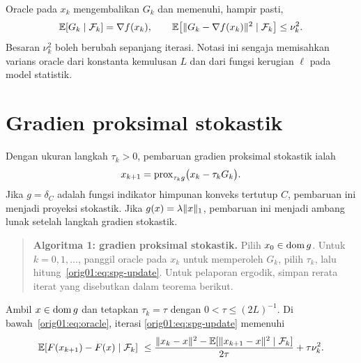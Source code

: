 Oracle pada $x_k$ mengembalikan $G_k$ dan memenuhi, hampir pasti,
\begin{equation}
  \label{orig01:eq:oracle}
  \mathbb{E}[G_k\mid\mathcal F_k]=\nabla f(x_k),
  \qquad
  \mathbb{E}\!\left[\|G_k-\nabla f(x_k)\|^2\mid\mathcal F_k\right]
  \leq \nu_k^2.
\end{equation}
Besaran $\nu_k^2$ boleh berubah sepanjang iterasi. Notasi ini sengaja
memisahkan varians oracle dari konstanta kemulusan $L$ dan dari fungsi
kerugian $\ell$ pada model statistik.

\section{Gradien proksimal stokastik}
\label{orig01:section:spg}

Dengan ukuran langkah $\tau_k>0$, pembaruan gradien proksimal stokastik ialah
\begin{equation}
  \label{orig01:eq:spg-update}
  x_{k+1}
  =\mathrm{prox}_{\tau_k g}\bigl(x_k-\tau_kG_k\bigr).
\end{equation}
Jika $g=\delta_C$ adalah fungsi indikator himpunan konveks tertutup $C$,
pembaruan ini menjadi proyeksi stokastik. Jika $g(x)=\lambda\|x\|_1$,
pembaruan ini menjadi ambang lunak setelah langkah gradien stokastik.

\begin{quote}
\textbf{Algoritma 1: gradien proksimal stokastik.}
Pilih $x_0\in\operatorname{\mathrm{dom}} g$. Untuk $k=0,1,\dots$, panggil oracle pada $x_k$ untuk
memperoleh $G_k$, pilih $\tau_k$, lalu hitung~\eqref{orig01:eq:spg-update}.
Untuk pelaporan ergodik, simpan rerata iterat yang disebutkan dalam teorema
berikut.
\end{quote}

\begin{lemma}
  \label{orig01:lemma:spg-one-step}
  Ambil $x\in\operatorname{\mathrm{dom}} g$ dan tetapkan $\tau_k=\tau$ dengan
  $0<\tau\leq(2L)^{-1}$. Di bawah~\eqref{orig01:eq:oracle}, iterasi
  \eqref{orig01:eq:spg-update} memenuhi
  \begin{multline}
    \label{orig01:eq:spg-one-step}
    \mathbb{E}[F(x_{k+1})-F(x)\mid\mathcal F_k]\
    \leq
    \frac{\|x_k-x\|^2-
                \mathbb{E}[\|x_{k+1}-x\|^2\mid\mathcal F_k]}{2\tau}
    +\tau\nu_k^2.
  \end{multline}
\end{lemma}

